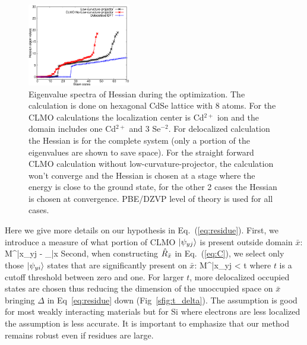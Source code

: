 \documentclass[aps,prl,twocolumn,reprint,amsmath,amssymb]{revtex4-1}
\begin{document}
\begin{figure}
\centering
\includegraphics[width=0.4\textwidth]{Hesseig}
\caption{Eigenvalue spectra of Hessian during the optimization. The calculation is done on hexagonal CdSe lattice with 8 atoms. For the CLMO calculations the localization center is Cd$^{2+}$ ion and the domain includes one Cd$^{2+}$ and 3 Se$^{-2}$. For delocalized calculation the Hessian is for the complete system (only a portion of the eigenvalues are shown to save space). For the straight forward CLMO calculation without low-curvature-projector, the calculation won't converge and the Hessian is chosen at a stage where the energy is close to the ground state, for the other 2 cases the Hessian is chosen at convergence. PBE/DZVP level of theory is used for all cases.}
\label{sfig:hesseig}
\end{figure}

Here we give more details on our hypothesis in Eq.~(\ref{eq:residue}). First, we introduce a measure of what portion of CLMO $\vert \psi_{yj} \rangle$ is present outside domain $\bar{x}$:
\bea
M^{\bar{x}}_{yj} \equiv {} - _{\bar{x}}
\eea
%
Second, when constructing $\hat{R}_{\bar{x}}$ in Eq.~(\ref{eq:C}), we select only those $\vert \psi_{yi} \rangle$ states that are significantly present on $\bar{x}$: 
\bea
M^{\bar{x}}_{yj} < t
\eea
%
where $t$ is a cutoff threshold between zero and one. 
For larger $t$, more delocalized occupied states are chosen thus reducing the dimension of the unoccupied space on $\bar{x}$ bringing $\Delta$ in Eq~\ref{eq:residue} down (Fig~\ref{sfig:t_delta}). 
The assumption is good for most weakly interacting materials but for Si where electrons are less localized the assumption is less accurate. It is important to emphasize that our method remains robust even if residues are large.
\end{document}
